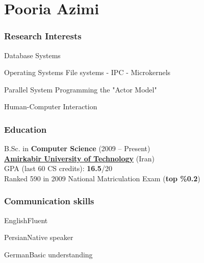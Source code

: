 \documentclass{tccv}
\begin{document}
\thispagestyle{empty}
\part{Pooria Azimi}




\section{Research Interests}


\begin{research_interest}

\item{Database Systems}
     {}

\item{Operating Systems}
     {File systems - IPC - Microkernels}

\item{Parallel System Programming}
     {the "Actor Model"}

\item{Human-Computer Interaction}
     {}

\end{research_interest}








\section{Education}

B.Sc. in {\bf\large Computer Science} (2009 -- Present)
\\[1.5pt]
{\bf \href{https://en.wikipedia.org/wiki/Amirkabir_University_of_Technology}{Amirkabir University of Technology}} (Iran)
\\[1.7pt]
GPA (last 60 CS credits): {\bf 16.5}/20
\bigskip\\
Ranked 590 in 2009 National Matriculation Exam ({\bf top \%0.2})








\section{Communication skills}


\begin{factlist}

\item{English}{Fluent}

\item{Persian}{Native speaker}

\item{German}{Basic understanding}

\end{factlist}
\end{document}
